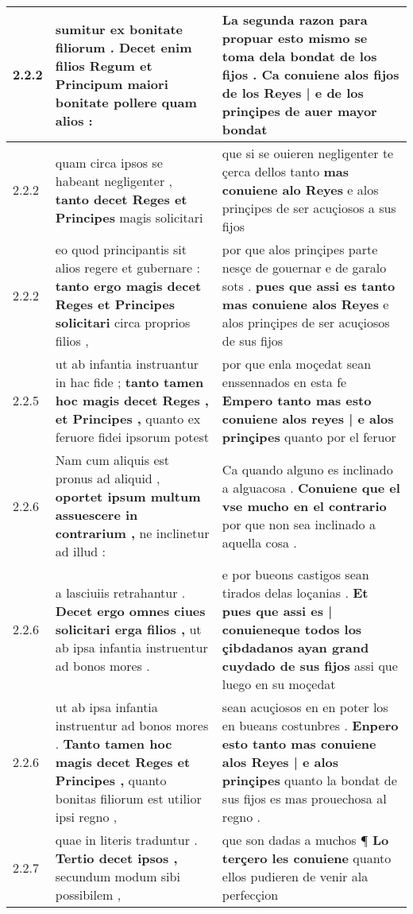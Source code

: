 \begin{tabular}{|p{1cm}|p{6.5cm}|p{6.5cm}|}
2.2.2 & sumitur ex bonitate filiorum . \textbf{ Decet enim filios Regum et Principum } maiori bonitate pollere quam alios : & La segunda razon para propuar esto mismo se toma dela bondat de los fijos . \textbf{ Ca conuiene alos fijos de los Reyes | e de los prinçipes } de auer mayor bondat \\\hline
2.2.2 & quam circa ipsos se habeant negligenter , \textbf{ tanto decet Reges et Principes } magis solicitari & que si se ouieren negligenter te çerca dellos tanto \textbf{ mas conuiene alo Reyes } e alos prinçipes de ser acuçiosos a sus fijos \\\hline
2.2.2 & eo quod principantis sit alios regere et gubernare : \textbf{ tanto ergo magis decet Reges et Principes solicitari } circa proprios filios , & por que alos prinçipes parte nesçe de gouernar e de garalo sots . \textbf{ pues que assi es tanto mas conuiene alos Reyes } e alos prinçipes de ser acuçiosos de sus fijos \\\hline
2.2.5 & ut ab infantia instruantur in hac fide ; \textbf{ tanto tamen hoc magis decet Reges , et Principes , } quanto ex feruore fidei ipsorum potest & por que enla moçedat sean enssennados en esta fe \textbf{ Empero tanto mas esto conuiene alos reyes | e alos prinçipes } quanto por el feruor \\\hline
2.2.6 & Nam cum aliquis est pronus ad aliquid , \textbf{ oportet ipsum multum assuescere in contrarium , } ne inclinetur ad illud : & Ca quando alguno es inclinado a alguacosa . \textbf{ Conuiene que el vse mucho en el contrario } por que non sea inclinado a aquella cosa . \\\hline
2.2.6 & a lasciuiis retrahantur . \textbf{ Decet ergo omnes ciues solicitari erga filios , } ut ab ipsa infantia instruentur ad bonos mores . & e por bueons castigos sean tirados delas loçanias . \textbf{ Et pues que assi es | conuieneque todos los çibdadanos ayan grand cuydado de sus fijos } assi que luego en su moçedat \\\hline
2.2.6 & ut ab ipsa infantia instruentur ad bonos mores . \textbf{ Tanto tamen hoc magis decet Reges et Principes , } quanto bonitas filiorum est utilior ipsi regno , & sean acuçiosos en en poter los en bueans costunbres . \textbf{ Enpero esto tanto mas conuiene alos Reyes | e alos prinçipes } quanto la bondat de sus fijos es mas prouechosa al regno . \\\hline
2.2.7 & quae in literis traduntur . \textbf{ Tertio decet ipsos , } secundum modum sibi possibilem , & que son dadas a muchos ¶ \textbf{ Lo terçero les conuiene } quanto ellos pudieren de venir ala perfecçion \\\hline

\end{tabular}
